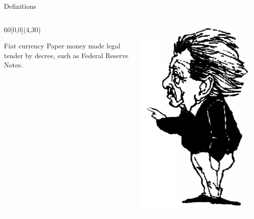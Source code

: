 \begin{frame}{Definitions}
    \begin{columns}[onlytextwidth]
        \begin{textblock}{60}[0,0](4,30)
            \begin{varblock}[0.9\textwidth]{Fiat currency}%
                Paper money made legal tender by decree, such as Federal Reserve Notes.
            \end{varblock}
        \end{textblock}

            \centering
            \includegraphics[height=0.75\textheight]{img/einstein.png} \\

    \end{columns}
\end{frame}

